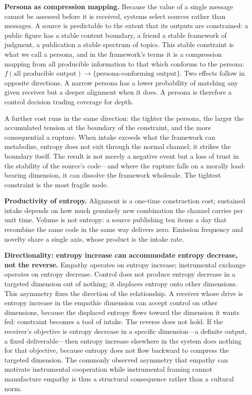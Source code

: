 \documentclass[11pt,a4paper]{article}
\begin{document}
\textbf{Persona as compression mapping.} Because the value of a single message cannot be assessed before it is received, systems select sources rather than messages. A source is predictable to the extent that its outputs are constrained: a public figure has a stable content boundary, a friend a stable framework of judgment, a publication a stable spectrum of topics. This stable constraint is what we call a persona, and in the framework's terms it is a compression mapping from all producible information to that which conforms to the persona: $f(\text{all producible output}) \rightarrow \{\text{persona-conforming output}\}$. Two effects follow in opposite directions. A narrow persona has a lower probability of matching any given receiver but a deeper alignment when it does. A persona is therefore a control decision trading coverage for depth.

A further cost runs in the same direction: the tighter the persona, the larger the accumulated tension at the boundary of the constraint, and the more consequential a rupture. When intake exceeds what the framework can metabolize, entropy does not exit through the normal channel; it strikes the boundary itself. The result is not merely a negative event but a loss of trust in the stability of the source's code---and where the rupture falls on a morally load-bearing dimension, it can dissolve the framework wholesale. The tightest constraint is the most fragile node.

\textbf{Productivity of entropy.} Alignment is a one-time construction cost; sustained intake depends on how much genuinely new combination the channel carries per unit time. Volume is not entropy: a source publishing ten items a day that recombine the same code in the same way delivers zero. Emission frequency and novelty share a single axis, whose product is the intake rate.

\textbf{Directionality: entropy increase can accommodate entropy decrease, not the reverse.} Empathy operates on entropy increase; instrumental exchange operates on entropy decrease. Control does not produce entropy decrease in a targeted dimension out of nothing; it displaces entropy onto other dimensions. This asymmetry fixes the direction of the relationship. A receiver whose drive is entropy increase in the empathic dimension can accept control on other dimensions, because the displaced entropy flows toward the dimension it wants fed: constraint becomes a tool of intake. The reverse does not hold. If the receiver's objective is entropy decrease in a specific dimension---a definite output, a fixed deliverable---then entropy increase elsewhere in the system does nothing for that objective, because entropy does not flow backward to compress the targeted dimension. The commonly observed asymmetry that empathy can motivate instrumental cooperation while instrumental framing cannot manufacture empathy is thus a structural consequence rather than a cultural norm.
\end{document}
